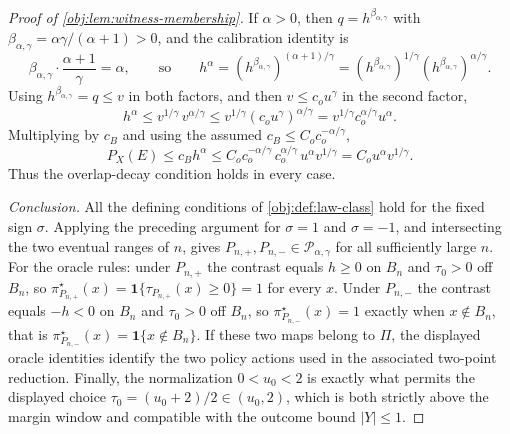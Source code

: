 \begin{proof}[Proof of \cref{obj:lem:witness-membership}]
If \(\alpha>0\), then \(q=h^{\beta_{\alpha,\gamma}}\) with \(\beta_{\alpha,\gamma}=\alpha\gamma/(\alpha+1)>0\), and the calibration identity is
\[
\beta_{\alpha,\gamma}\cdot\frac{\alpha+1}{\gamma}=\alpha,
\qquad\text{so}\qquad
h^\alpha=\left(h^{\beta_{\alpha,\gamma}}\right)^{(\alpha+1)/\gamma}
=\left(h^{\beta_{\alpha,\gamma}}\right)^{1/\gamma}\left(h^{\beta_{\alpha,\gamma}}\right)^{\alpha/\gamma}.
\]
Using \(h^{\beta_{\alpha,\gamma}}=q\le v\) in both factors, and then \(v\le c_ou^\gamma\) in the second factor,
\[
h^\alpha
\le
v^{1/\gamma}\,v^{\alpha/\gamma}
\le
v^{1/\gamma}\left(c_ou^\gamma\right)^{\alpha/\gamma}
=
v^{1/\gamma}c_o^{\alpha/\gamma}u^\alpha .
\]
Multiplying by \(c_B\) and using the assumed \(c_B\le C_oc_o^{-\alpha/\gamma}\),
\[
P_X(E)\le c_Bh^\alpha
\le
C_oc_o^{-\alpha/\gamma}\,c_o^{\alpha/\gamma}\,u^\alpha v^{1/\gamma}
=
C_ou^\alpha v^{1/\gamma}.
\]
Thus the overlap-decay condition holds in every case.

\emph{Conclusion.}  All the defining conditions of \cref{obj:def:law-class} hold for the fixed sign \(\sigma\).  Applying the preceding argument for \(\sigma=1\) and \(\sigma=-1\), and intersecting the two eventual ranges of \(n\), gives \(P_{n,+},P_{n,-}\in\mathcal P_{\alpha,\gamma}\) for all sufficiently large \(n\). %
For the oracle rules: under \(P_{n,+}\) the contrast equals \(h\ge0\) on \(B_n\) and \(\tau_0>0\) off \(B_n\), so \(\pi^\star_{P_{n,+}}(x)=\mathbf 1\{\tau_{P_{n,+}}(x)\ge0\}=1\) for every \(x\). %
Under \(P_{n,-}\) the contrast equals \(-h<0\) on \(B_n\) and \(\tau_0>0\) off \(B_n\), so \(\pi^\star_{P_{n,-}}(x)=1\) exactly when \(x\notin B_n\), that is \(\pi^\star_{P_{n,-}}(x)=\mathbf 1\{x\notin B_n\}\). %
If these two maps belong to \(\Pi\), the displayed oracle identities identify the two policy actions used in the associated two-point reduction.  Finally, the normalization \(0<u_0<2\) is exactly what permits the displayed choice \(\tau_0=(u_0+2)/2\in(u_0,2)\), which is both strictly above the margin window and compatible with the outcome bound \(|Y|\le1\). %
\end{proof}
